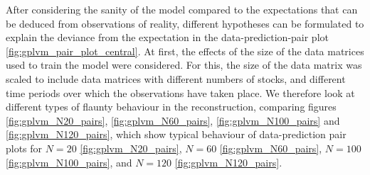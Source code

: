 After considering the sanity of the model compared to the expectations that can be deduced from observations of reality, different hypotheses can be formulated to explain the deviance from the expectation in the data-prediction-pair plot \ref{fig:gplvm_pair_plot_central}. At first, the effects of the size of the data matrices used to train the model were considered. For this, the size of the data matrix was scaled to include data matrices with different numbers of stocks, and different time periods over which the observations have taken place. We therefore look at different types of flaunty behaviour in the reconstruction, comparing figures \ref{fig:gplvm_N20_pairs}, \ref{fig:gplvm_N60_pairs}, \ref{fig:gplvm_N100_pairs} and \ref{fig:gplvm_N120_pairs}, which show typical behaviour of data-prediction pair plots for $N=20$ \ref{fig:gplvm_N20_pairs}, $N=60$ \ref{fig:gplvm_N60_pairs}, $N=100$ \ref{fig:gplvm_N100_pairs}, and $N=120$ \ref{fig:gplvm_N120_pairs}. 
